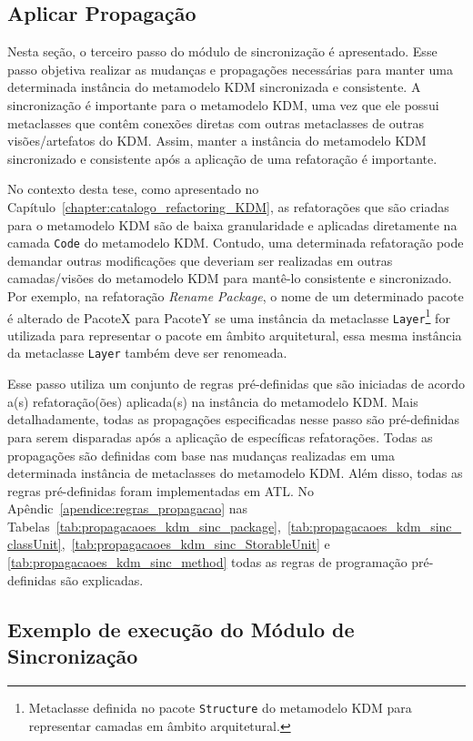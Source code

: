 \subsection{Aplicar Propagação}\label{subsec:aplicar_propagacao_KDM-SInc}

Nesta seção, o terceiro passo do módulo de sincronização é apresentado. Esse passo objetiva realizar as mudanças e propagações necessárias para manter uma determinada instância do metamodelo KDM sincronizada e consistente. A sincronização é importante para o metamodelo KDM, uma vez que ele possui metaclasses que contêm conexões diretas com outras metaclasses de outras visões/artefatos do KDM. Assim, manter a instância do metamodelo KDM sincronizado e consistente após a aplicação de uma refatoração é importante. 

No contexto desta tese, como apresentado no Capítulo~\ref{chapter:catalogo_refactoring_KDM}, as refatorações que são criadas para o metamodelo KDM são de baixa granularidade e aplicadas diretamente na camada \texttt{Code} do metamodelo KDM. Contudo, uma determinada refatoração pode demandar outras modificações que deveriam ser realizadas em outras camadas/visões do metamodelo KDM para mantê-lo consistente e sincronizado. Por exemplo, na refatoração \textit{Rename Package}, o nome de um determinado pacote é alterado de PacoteX para PacoteY se uma instância da metaclasse \texttt{Layer}\footnote{Metaclasse definida no pacote \texttt{Structure} do metamodelo KDM para representar camadas em âmbito arquitetural.} for utilizada para representar o pacote em âmbito arquitetural, essa mesma instância da metaclasse \texttt{Layer} também deve ser renomeada. 

Esse passo utiliza um conjunto de regras pré-definidas que são iniciadas de acordo a(s) refatoração(ões) aplicada(s) na instância do metamodelo KDM. Mais detalhadamente, todas as propagações especificadas nesse passo são pré-definidas para serem disparadas após a aplicação de específicas refatorações. Todas as propagações são definidas com base nas mudanças realizadas em uma determinada instância de metaclasses do metamodelo KDM. Além disso, todas as regras pré-definidas foram implementadas em ATL. No Apêndic~\ref{apendice:regras_propagacao} nas Tabelas~\ref{tab:propagacaoes_kdm_sinc_package},~\ref{tab:propagacaoes_kdm_sinc_classUnit},~\ref{tab:propagacaoes_kdm_sinc_StorableUnit} e \ref{tab:propagacaoes_kdm_sinc_method} todas as regras de programação pré-definidas são explicadas.  

\subsection{Exemplo de execução do Módulo de Sincronização}

